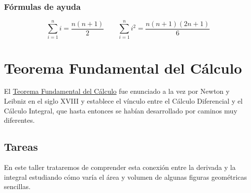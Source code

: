 \documentclass[
  a4paper,
]{scrreport}
\begin{document}
\subsection{Fórmulas de ayuda}\label{fuxf3rmulas-de-ayuda}

\[
\sum_{i=1}^n i = \dfrac{n(n+1)}{2}\qquad \sum_{i=1}^n i^2 = \dfrac{n(n+1)(2n+1)}{6}
\]


\chapter{Teorema Fundamental del
Cálculo}\label{teorema-fundamental-del-cuxe1lculo}

El
\href{https://aprendeconalf.es/analisis-manual/09-integrales.html\#thm-teorema-fundamental-calculo-1}{Teorema
Fundamental del Cálculo} fue enunciado a la vez por Newton y Leibniz en
el siglo XVIII y establece el vínculo entre el Cálculo Diferencial y el
Cálculo Integral, que hasta entonces se habían desarrollado por caminos
muy diferentes.

\section{Tareas}\label{tareas-2}

En este taller trataremos de comprender esta conexión entre la derivada
y la integral estudiando cómo varía el área y volumen de algunas figuras
geométricas sencillas.
\end{document}
